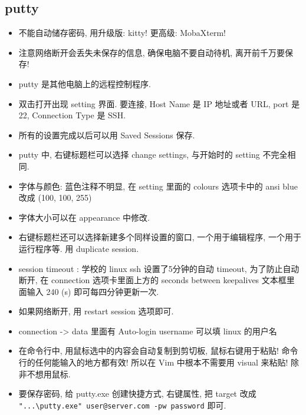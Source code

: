 \subsection{putty}
\begin{itemize}
\item 不能自动储存密码, 用升级版: kitty! 更高级: MobaXterm!
\item 注意网络断开会丢失未保存的信息, 确保电脑不要自动待机, 离开前千万要保存!
\item putty 是其他电脑上的远程控制程序.
\item 双击打开出现 setting 界面. 要连接, Host Name 是 IP 地址或者 URL, port 是 22, Connection Type 是 SSH.
\item 所有的设置完成以后可以用 Saved Sessions 保存.
\item putty 中, 右键标题栏可以选择 change settings, 与开始时的 setting 不完全相同.
\item 字体与颜色: 蓝色注释不明显, 在 setting 里面的 colours 选项卡中的 ansi blue 改成 (100, 100, 255)
\item 字体大小可以在 appearance 中修改.
\item 右键标题栏还可以选择新建多个同样设置的窗口, 一个用于编辑程序, 一个用于运行程序等. 用 duplicate session.
\item session timeout : 学校的 linux ssh 设置了5分钟的自动 timeout, 为了防止自动断开, 在 connection 选项卡里面上方的 seconds between keepalives 文本框里面输入 240 (s) 即可每四分钟更新一次.
\item 如果网络断开, 用 restart session 选项即可.
\item connection -> data 里面有 Auto-login username 可以填 linux 的用户名
\item 在命令行中, 用鼠标选中的内容会自动复制到剪切板, 鼠标右键用于粘贴! 命令行的任何能输入的地方都有效! 所以在 Vim 中根本不需要用 visual 来粘贴! 除非不想用鼠标.
\item 要保存密码, 给 putty.exe 创建快捷方式, 右键属性, 把 target 改成 \verb|"...\putty.exe" user@server.com -pw password| 即可.
\end{itemize}

